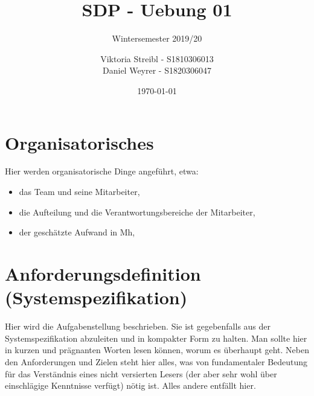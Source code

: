 


\title{SDP - Uebung 01} %
\subtitle{Wintersemester 2019/20} %
\author{
Viktoria Streibl - S1810306013\\
  Daniel Weyrer - S1820306047
} %
\date{\today} %

\maketitle %

\newpage
\tableofcontents %
\newpage


\section{Organisatorisches}

Hier werden organisatorische Dinge angeführt, etwa:
\begin{itemize}
	\item das Team und seine Mitarbeiter,
	\item die Aufteilung und die Verantwortungsbereiche der Mitarbeiter,
	\item der geschätzte Aufwand in Mh,
\end{itemize}




\section{Anforderungsdefinition (Systemspezifikation)}

Hier wird die Aufgabenstellung beschrieben. Sie ist gegebenfalls aus der Systemspezifikation abzuleiten und in kompakter Form zu halten. Man sollte hier in kurzen und
prägnanten Worten lesen können, worum es überhaupt geht. Neben den Anforderungen und Zielen steht hier alles, was von fundamentaler Bedeutung für das Verständnis
eines nicht versierten Lesers (der aber sehr wohl über einschlägige Kenntnisse verfügt) nötig ist. Alles andere entfällt hier.

